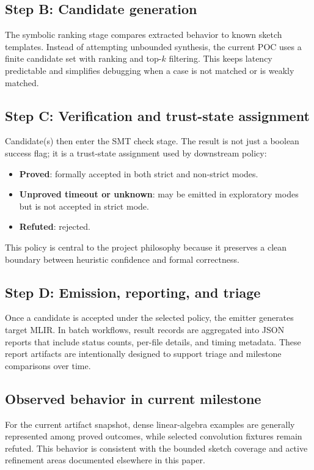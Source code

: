 \documentclass[conference]{IEEEtran}
\begin{document}
\subsection{Step B: Candidate generation}
The symbolic ranking stage compares extracted behavior to known sketch templates. Instead of attempting unbounded synthesis, the current POC uses a finite candidate set with ranking and top-$k$ filtering. This keeps latency predictable and simplifies debugging when a case is not matched or is weakly matched.

\subsection{Step C: Verification and trust-state assignment}
Candidate(s) then enter the SMT check stage. The result is not just a boolean success flag; it is a trust-state assignment used by downstream policy:
\begin{itemize}
\item \textbf{Proved}: formally accepted in both strict and non-strict modes.
\item \textbf{Unproved timeout or unknown}: may be emitted in exploratory modes but is not accepted in strict mode.
\item \textbf{Refuted}: rejected.
\end{itemize}
This policy is central to the project philosophy because it preserves a clean boundary between heuristic confidence and formal correctness.

\subsection{Step D: Emission, reporting, and triage}
Once a candidate is accepted under the selected policy, the emitter generates target MLIR. In batch workflows, result records are aggregated into JSON reports that include status counts, per-file details, and timing metadata. These report artifacts are intentionally designed to support triage and milestone comparisons over time.

\subsection{Observed behavior in current milestone}
For the current artifact snapshot, dense linear-algebra examples are generally represented among proved outcomes, while selected convolution fixtures remain refuted. This behavior is consistent with the bounded sketch coverage and active refinement areas documented elsewhere in this paper.
\end{document}
